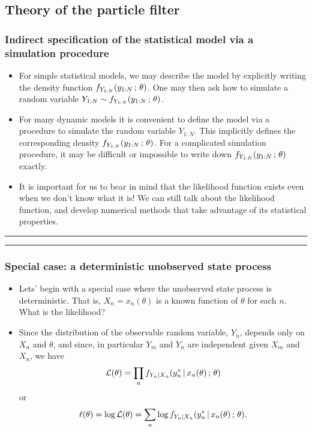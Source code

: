 \documentclass[]{article}
\begin{document}
\subsection{Theory of the particle
filter}\label{theory-of-the-particle-filter}

\subsubsection{Indirect specification of the statistical model via a
simulation
procedure}\label{indirect-specification-of-the-statistical-model-via-a-simulation-procedure}

\begin{itemize}
\item
  For simple statistical models, we may describe the model by explicitly
  writing the density function \(f_{Y_{1:N}}(y_{1:N}\, ; \,\theta)\).
  One may then ask how to simulate a random variable
  \(Y_{1:N}\sim f_{Y_{1:N}}(y_{1:N}\, ; \,\theta)\).
\item
  For many dynamic models it is convenient to define the model via a
  procedure to simulate the random variable \(Y_{1:N}\). This implicitly
  defines the corresponding density
  \(f_{Y_{1:N}}(y_{1:N}\, ; \,\theta)\). For a complicated simulation
  procedure, it may be difficult or impossible to write down
  \(f_{Y_{1:N}}(y_{1:N}\, ; \,\theta)\) exactly.
\item
  It is important for us to bear in mind that the likelihood function
  exists even when we don't know what it is! We can still talk about the
  likelihood function, and develop numerical methods that take advantage
  of its statistical properties.
\end{itemize}

\begin{center}\rule{0.5\linewidth}{\linethickness}\end{center}

\begin{center}\rule{0.5\linewidth}{\linethickness}\end{center}

\subsubsection{Special case: a deterministic unobserved state
process}\label{special-case-a-deterministic-unobserved-state-process}

\begin{itemize}
\item
  Lets' begin with a special case where the unobserved state process is
  deterministic. That is, \(X_{n}=x_n(\theta)\) is a known function of
  \(\theta\) for each \(n\). What is the likelihood?
\item
  Since the distribution of the observable random variable, \(Y_n\),
  depends only on \(X_n\) and \(\theta\), and since, in particular
  \(Y_{m}\) and \(Y_{n}\) are independent given \(X_{m}\) and \(X_{n}\),
  we have
  \[\mathcal{L}(\theta) = \prod_{n} f_{Y_n|X_n}(y_n^*{\, | \,} x_n(\theta)\, ; \, \theta)\]
  or
  \[\ell(\theta) = \log\mathcal{L}(\theta) = \sum_{n} \log f_{Y_n|X_n}(y_n^*{\, | \,} x_n(\theta)\, ; \, \theta).\]
\end{itemize}
\end{document}

